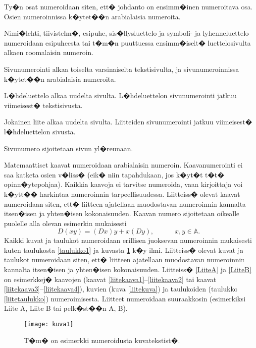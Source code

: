 \documentclass[finnish,12pt,a4paper,pdftex]{article}
\begin{document}
Ty�n osat numeroidaan siten, ett� johdanto on ensimm�inen numeroitava
osa. Osien numeroinnissa k�ytet��n arabialaisia numeroita.

Nimi�lehti, tiivistelm�, esipuhe, sis�llysluettelo ja symboli- ja
lyhenneluettelo numeroidaan esipuheesta tai t�m�n puuttuessa 
ensimm�iselt� luettelosivulta alkaen roomalaisin numeroin.

Sivunumerointi alkaa toiselta varsinaiselta tekstisivulta, ja 
sivunumeroinnissa k�ytet��n arabialaisia numeroita.

L�hdeluettelo alkaa uudelta sivulta. L�hdeluettelon sivunumerointi 
jatkuu viimeisest� tekstisivusta.

Jokainen liite alkaa uudelta sivulta. Liitteiden sivunumerointi
jatkuu viimeisest� l�hdeluettelon sivusta.

Sivunumero sijoitetaan sivun yl�reunaan.

Matemaattiset kaavat numeroidaan arabialaisin
numeroin. Kaavanumerointi ei saa katketa osien v�liss� (eik� niin
tapahdukaan, jos k�yt�t t�t� opinn�ytepohjaa). Kaikkia kaavoja ei tarvitse
numeroida, vaan kirjoittaja voi k�ytt�� harkintaa numeroinnin
tarpeellisuudessa.  Liitteiss� olevat kaavat numeroidaan siten, ett�
liitteen ajatellaan muodostavan numeroinnin kannalta itsen�isen ja
yhten�isen kokonaisuuden. Kaavan numero sijoitetaan oikealle puolelle
alla olevan esimerkin mukaisesti
\begin{equation}
D(xy) = (Dx)y + x(Dy),  \hspace{3em} x,y \in \mathbb{A}.
\end{equation}
Kaikki kuvat ja taulukot numeroidaan erillisen juoksevan numeroinnin
mukaisesti kuten taulukosta \ref{taulukko1} ja kuvasta \ref{kuva1} k�y
ilmi.  Liitteiss� olevat kuvat ja taulukot numeroidaan siten, ett�
liitteen ajatellaan muodostavan numeroinnin kannalta itsen�isen ja
yhten�isen kokonaisuuden. Liitteiss� \ref{LiiteA} ja \ref{LiiteB} on
esimerkkej� kaavojen (kaavat \ref{liitekaava1}--\ref{liitekaava2} tai
kaavat \ref{liitekaava3}--\ref{liitekaava4}), kuvien (kuva
\ref{liitekuva}) ja taulukoiden (taulukko \ref{liitetaulukko})
numeroimisesta.  Liitteet numeroidaan suuraakkosin (esimerkiksi Liite
A, Liite B tai pelk�st��n A, B).
\begin{figure}[htb]
\centering \texttt{[image: kuva1]}
\caption{T�m� on esimerkki numeroidusta kuvatekstist�. \label{kuva1}}
\end{figure}
\end{document}

